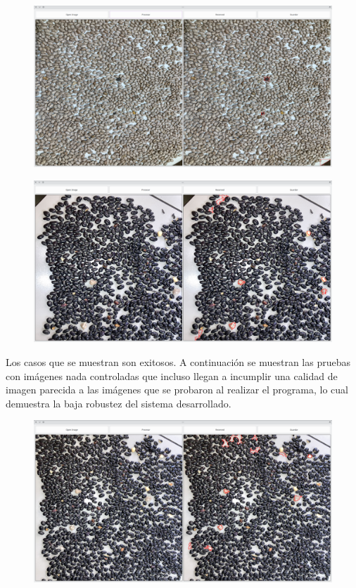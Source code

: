 \documentclass[conference]{IEEEtran}
\begin{document}
    \begin{figure}[H]
        \centering
        \includegraphics[width=\breite\linewidth]{images/pintos.png}
        \caption{}
        \label{fig:res2}
    \end{figure}

    \begin{figure}[H]
        \centering
        \includegraphics[width=\breite\linewidth]{images/negros.png}
        \caption{}
        \label{fig:res3}
    \end{figure}

    Los casos que se muestran son exitosos. A continuación se muestran las pruebas con imágenes nada controladas que incluso llegan a incumplir una calidad de imagen parecida a las imágenes que se probaron al realizar el programa, lo cual demuestra la baja robustez del sistema desarrollado.

    \begin{figure}[H]
        \centering
        \includegraphics[width=\breite\linewidth]{images/test1.png}
        \caption{}
        \label{fig:test1}
    \end{figure}
\end{document}
